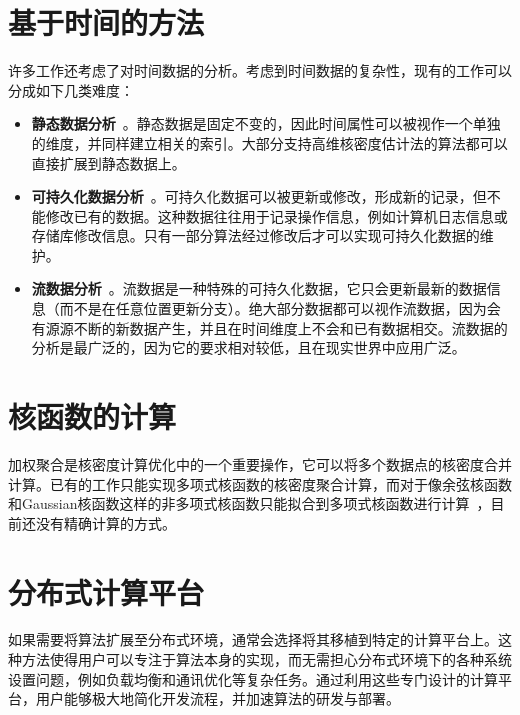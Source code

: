 \section{基于时间的方法}

许多工作还考虑了对时间数据的分析。考虑到时间数据的复杂性，现有的工作可以分成如下几类难度：

\begin{itemize}[leftmargin=*]
	\item \textbf{静态数据分析}~\cite{patuelli2007network, mouratidis2006continuous}。静态数据是固定不变的，因此时间属性可以被视作一个单独的维度，并同样建立相关的索引。大部分支持高维核密度估计法的算法都可以直接扩展到静态数据上。
	
	\item \textbf{可持久化数据分析}~\cite{sasikala2014uncertain, cheng2012spatio}。可持久化数据可以被更新或修改，形成新的记录，但不能修改已有的数据。这种数据往往用于记录操作信息，例如计算机日志信息或存储库修改信息。只有一部分算法经过修改后才可以实现可持久化数据的维护。
	
	\item \textbf{流数据分析}~\cite{koudas2004approximate, figueiras2018real, li2021trace}。流数据是一种特殊的可持久化数据，它只会更新最新的数据信息（而不是在任意位置更新分支）。绝大部分数据都可以视作流数据，因为会有源源不断的新数据产生，并且在时间维度上不会和已有数据相交。流数据的分析是最广泛的，因为它的要求相对较低，且在现实世界中应用广泛。
\end{itemize}

\section{核函数的计算}

	加权聚合是核密度计算优化中的一个重要操作，它可以将多个数据点的核密度合并计算。已有的工作只能实现多项式核函数的核密度聚合计算，而对于像余弦核函数和Gaussian核函数这样的非多项式核函数只能拟合到多项式核函数进行计算~\cite{chan_karl_2019, chan_quad_2020}，目前还没有精确计算的方式。
	
	
\section{分布式计算平台}

如果需要将算法扩展至分布式环境，通常会选择将其移植到特定的计算平台上。这种方法使得用户可以专注于算法本身的实现，而无需担心分布式环境下的各种系统设置问题，例如负载均衡和通讯优化等复杂任务。通过利用这些专门设计的计算平台，用户能够极大地简化开发流程，并加速算法的研发与部署。

